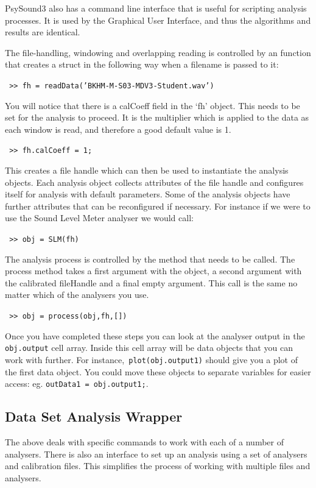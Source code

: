 \documentclass{article}
\begin{document}
PsySound3 also has a command line interface that is useful for scripting analysis processes. It is used by the Graphical User Interface, and thus the algorithms and results are identical. 

The file-handling, windowing and overlapping reading is controlled by an function that creates a struct in the following way when a filename is passed to it:

\texttt{  >> fh = readData('BKHM-M-S03-MDV3-Student.wav')}

You will notice that there is a calCoeff field in the `fh' object. This needs to be set for the analysis to proceed. It is the multiplier which is applied to the data as each window is read, and therefore a good default value is 1. 

\texttt{ >> fh.calCoeff = 1;}

This creates a file handle which can then be used to instantiate the analysis objects. Each analysis object collects attributes of the file handle and configures itself for analysis with default parameters. Some of the analysis objects have further attributes that can be reconfigured if necessary. For instance if we were to use the Sound Level Meter analyser we would call:

\texttt{  >> obj = SLM(fh)}

The analysis process is controlled by the  method that needs to be called. The process method takes a first argument with the object, a second argument with the calibrated fileHandle and a final empty argument. This call is the same no matter which of the analysers you use.

\texttt{ >> obj = process(obj,fh,[])}

Once you have completed these steps you can look at the analyser output in the \texttt{obj.output} cell array. Inside this cell array will be data objects that you can work with further. For instance,\texttt{  plot(obj.output{1})} should give you a plot of the first data object. You could move these objects to separate variables for easier access: eg. \texttt{outData1 = obj.output{1};}. 

\subsection{Data Set Analysis Wrapper}

The above deals with specific commands to work with each of a number of analysers. There is also an interface to set up an analysis using a set of analysers and calibration files. This simplifies the process of working with multiple files and analysers. 
\end{document}

